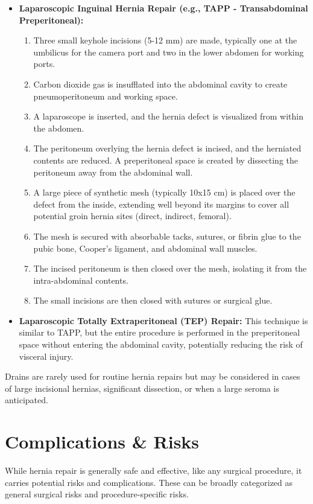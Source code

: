 \begin{itemize}
  \item \textbf{Laparoscopic Inguinal Hernia Repair (e.g., TAPP - Transabdominal Preperitoneal):}
  \begin{enumerate}
    \item Three small keyhole incisions (5-12 mm) are made, typically one at the umbilicus for the camera port and two in the lower abdomen for working ports.
    \item Carbon dioxide gas is insufflated into the abdominal cavity to create pneumoperitoneum and working space.
    \item A laparoscope is inserted, and the hernia defect is visualized from within the abdomen.
    \item The peritoneum overlying the hernia defect is incised, and the herniated contents are reduced. A preperitoneal space is created by dissecting the peritoneum away from the abdominal wall.
    \item A large piece of synthetic mesh (typically 10x15 cm) is placed over the defect from the inside, extending well beyond its margins to cover all potential groin hernia sites (direct, indirect, femoral).
    \item The mesh is secured with absorbable tacks, sutures, or fibrin glue to the pubic bone, Cooper's ligament, and abdominal wall muscles.
    \item The incised peritoneum is then closed over the mesh, isolating it from the intra-abdominal contents.
    \item The small incisions are then closed with sutures or surgical glue.
  \end{enumerate}

  \item \textbf{Laparoscopic Totally Extraperitoneal (TEP) Repair:} This technique is similar to TAPP, but the entire procedure is performed in the preperitoneal space without entering the abdominal cavity, potentially reducing the risk of visceral injury.
\end{itemize}

Drains are rarely used for routine hernia repairs but may be considered in cases of large incisional hernias, significant dissection, or when a large seroma is anticipated.

\section*{Complications \& Risks}
While hernia repair is generally safe and effective, like any surgical procedure, it carries potential risks and complications. These can be broadly categorized as general surgical risks and procedure-specific risks.

